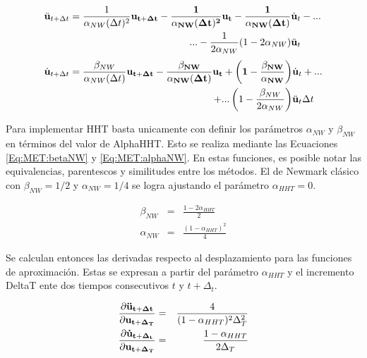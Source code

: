 \begin{align}
	 \ddot{\bf{u}}_{t+\Delta t} &=
	\begin{aligned}[t]
		\frac{1}{\alpha_{NW}(\Delta t)^2} \bf{u}_{t+\Delta t} - \frac{1}{\alpha_{NW} (\Delta t)^2} \bf{u}_{t} 	- \frac{1}{\alpha_{NW} (\Delta t)  }& \dot{\bf{u}}_{t}-... \\
		...-\frac{1}{2 \alpha_{NW}}  (1-2\alpha_{NW} ) &\ddot{\bf{u}}_{t} \\
	\end{aligned}
	 \label{Eq:MET:AproxAceleracion} \\[\jot]
	\dot{\bf{u}}_{t+\Delta t} &=
	\begin{aligned}[t]
	 \frac{\beta_{NW}}{\alpha_{NW} (\Delta t)} \bf{u}_{t+\Delta t}
	- \frac{\beta_{NW}}{\alpha_{NW} (\Delta t)} \bf{u}_{t}
	+ \left( 1 - \frac{\beta_{NW}}{\alpha_{NW}} \right) &\dot{\bf{u}}_{t}+... \\
	+ ...\left( 1- \frac{\beta_{NW}}{2 \alpha_{NW}} \right) &\ddot{\bf{u}}_{t} \Delta t
	\end{aligned}
 \label{Eq:MET:AproxVelcoity}
\end{align}


Para implementar HHT basta unicamente con definir los parámetros $\alpha_{NW}$ y $\beta_{NW}$ en términos del valor de \gls{AlphaHHT}. Esto se realiza mediante las Ecuaciones \eqref{Eq:MET:betaNW} y \eqref{Eq:MET:alphaNW}. En estas funciones, es posible notar las equivalencias, parentescos y similitudes entre los métodos. El de Newmark clásico con $\beta_{NW}=1/2$ y $\alpha_{NW} =1/4$ se logra ajustando el parámetro $\alpha_{HHT}=0$. 

\begin{eqnarray}
	\label{Eq:MET:betaNW}
 	\beta_{NW} &=& \frac{1-2\alpha_{HHT}}{2}\\
 	\label{Eq:MET:alphaNW}
 	\alpha_{NW} &=& \frac{(1-\alpha_{HHT})^2}{4}
\end{eqnarray}

Se calculan entonces las derivadas respecto al desplazamiento para las funciones de aproximación. Estas se expresan a partir del parámetro $\alpha_{HHT}$ y el incremento \gls{DeltaT} ente dos tiempos consecutivos $t$ y $t+\Delta_t$.

\begin{eqnarray}
\label{Eq:Met:DerivadasAcelLinear}
\frac{\partial \bf{\ddot{u}_{t+\Delta t}}}{\partial \bf{{u}_{t+\Delta_T}}}& = &
\frac{4}{(1-\alpha_{HHT})^2 \Delta_T^2}\\
\label{Eq:Met:DerivadasVelLinear}
\frac{\partial \bf{\dot{u}_{t+\Delta_t}}}{\partial \bf{{u}_{t+\Delta_T}}}& = &
\frac{1-\alpha_{HHT}}{2\Delta_T}
\end{eqnarray}

